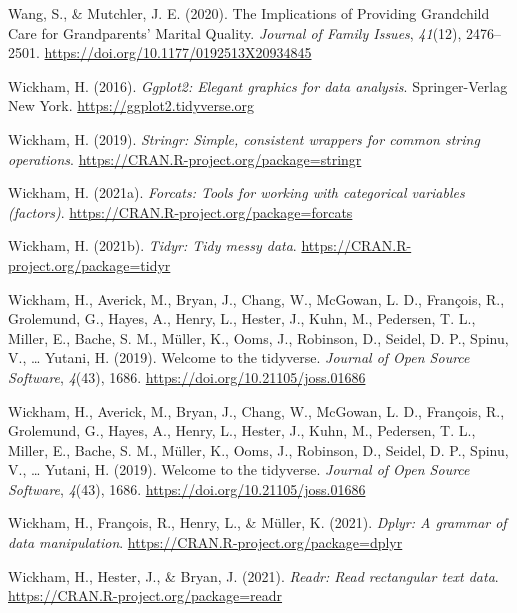 \documentclass[
  english,
  man,floatsintext]{apa7}
\begin{document}
\leavevmode\hypertarget{ref-wangImplicationsProvidingGrandchild2020}{}%
Wang, S., \& Mutchler, J. E. (2020). The Implications of Providing Grandchild Care for Grandparents' Marital Quality. \emph{Journal of Family Issues}, \emph{41}(12), 2476--2501. \url{https://doi.org/10.1177/0192513X20934845}

\leavevmode\hypertarget{ref-R-ggplot2}{}%
Wickham, H. (2016). \emph{Ggplot2: Elegant graphics for data analysis}. Springer-Verlag New York. \url{https://ggplot2.tidyverse.org}

\leavevmode\hypertarget{ref-R-stringr}{}%
Wickham, H. (2019). \emph{Stringr: Simple, consistent wrappers for common string operations}. \url{https://CRAN.R-project.org/package=stringr}

\leavevmode\hypertarget{ref-R-forcats}{}%
Wickham, H. (2021a). \emph{Forcats: Tools for working with categorical variables (factors)}. \url{https://CRAN.R-project.org/package=forcats}

\leavevmode\hypertarget{ref-R-tidyr}{}%
Wickham, H. (2021b). \emph{Tidyr: Tidy messy data}. \url{https://CRAN.R-project.org/package=tidyr}

\leavevmode\hypertarget{ref-tidyverse2019}{}%
Wickham, H., Averick, M., Bryan, J., Chang, W., McGowan, L. D., François, R., Grolemund, G., Hayes, A., Henry, L., Hester, J., Kuhn, M., Pedersen, T. L., Miller, E., Bache, S. M., Müller, K., Ooms, J., Robinson, D., Seidel, D. P., Spinu, V., \ldots{} Yutani, H. (2019). Welcome to the tidyverse. \emph{Journal of Open Source Software}, \emph{4}(43), 1686. \url{https://doi.org/10.21105/joss.01686}

\leavevmode\hypertarget{ref-R-tidyverse}{}%
Wickham, H., Averick, M., Bryan, J., Chang, W., McGowan, L. D., François, R., Grolemund, G., Hayes, A., Henry, L., Hester, J., Kuhn, M., Pedersen, T. L., Miller, E., Bache, S. M., Müller, K., Ooms, J., Robinson, D., Seidel, D. P., Spinu, V., \ldots{} Yutani, H. (2019). Welcome to the tidyverse. \emph{Journal of Open Source Software}, \emph{4}(43), 1686. \url{https://doi.org/10.21105/joss.01686}

\leavevmode\hypertarget{ref-R-dplyr}{}%
Wickham, H., François, R., Henry, L., \& Müller, K. (2021). \emph{Dplyr: A grammar of data manipulation}. \url{https://CRAN.R-project.org/package=dplyr}

\leavevmode\hypertarget{ref-R-readr}{}%
Wickham, H., Hester, J., \& Bryan, J. (2021). \emph{Readr: Read rectangular text data}. \url{https://CRAN.R-project.org/package=readr}
\end{document}

